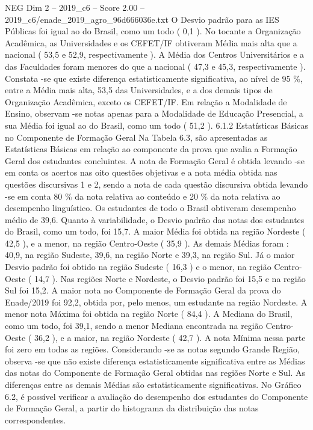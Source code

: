 \begin{textsample}{NEG Dim 2 – 2019\_c6 – Score 2.00 – 2019\_c6/enade\_2019\_agro\_96d666036e.txt}
O Desvio padrão para as IES Públicas foi igual ao do Brasil, como um todo ( 0,1 ).
No tocante a Organização Acadêmica, as Universidades e os CEFET/IF obtiveram Média mais alta que a nacional ( 53,5 e 52,9, respectivamente ).
A Média dos Centros Universitários e a das Faculdades foram menores do que a nacional ( 47,3 e 45,3, respectivamente ).
Constata -se que existe diferença estatisticamente significativa, ao nível de 95 \%, entre a Média mais alta, 53,5 das Universidades, e a dos demais tipos de Organização Acadêmica, exceto os CEFET/IF.
Em relação a Modalidade de Ensino, observam -se notas apenas para a Modalidade de Educação Presencial, a sua Média foi igual ao do Brasil, como um todo ( 51,2 ). 6.1.2 Estatísticas Básicas no Componente de Formação Geral Na Tabela 6.3, são apresentadas as Estatísticas Básicas em relação ao componente da prova que avalia a Formação Geral dos estudantes concluintes.
A nota de Formação Geral é obtida levando -se em conta os acertos nas oito questões objetivas e a nota média obtida nas questões discursivas 1 e 2, sendo a nota de cada questão discursiva obtida levando -se em conta 80 \% da nota relativa ao conteúdo e 20 \% da nota relativa ao desempenho linguístico.
Os estudantes de todo o Brasil obtiveram desempenho médio de 39,6.
Quanto à variabilidade, o Desvio padrão das notas dos estudantes do Brasil, como um todo, foi 15,7.
A maior Média foi obtida na região Nordeste ( 42,5 ), e a menor, na região Centro-Oeste ( 35,9 ).
As demais Médias foram : 40,9, na região Sudeste, 39,6, na região Norte e 39,3, na região Sul.
Já o maior Desvio padrão foi obtido na região Sudeste ( 16,3 ) e o menor, na região Centro-Oeste ( 14,7 ).
Nas regiões Norte e Nordeste, o Desvio padrão foi 15,5 e na região Sul foi 15,2.
A maior nota no Componente de Formação Geral da prova do Enade/2019 foi 92,2, obtida por, pelo menos, um estudante na região Nordeste.
A menor nota Máxima foi obtida na região Norte ( 84,4 ).
A Mediana do Brasil, como um todo, foi 39,1, sendo a menor Mediana encontrada na região Centro-Oeste ( 36,2 ), e a maior, na região Nordeste ( 42,7 ).
A nota Mínima nessa parte foi zero em todas as regiões.
Considerando -se as notas segundo Grande Região, observa -se que não existe diferença estatisticamente significativa entre as Médias das notas do Componente de Formação Geral obtidas nas regiões Norte e Sul.
As diferenças entre as demais Médias são estatisticamente significativas.
No Gráfico 6.2, é possível verificar a avaliação do desempenho dos estudantes do Componente de Formação Geral, a partir do histograma da distribuição das notas correspondentes.

\end{textsample}
